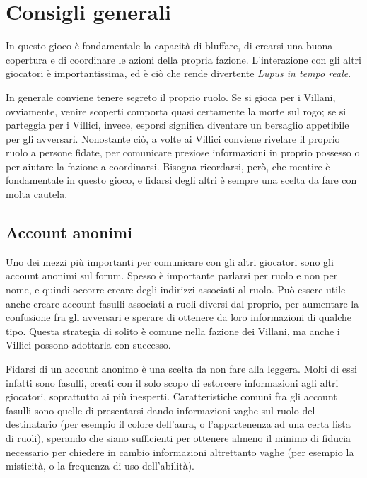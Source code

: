 \documentclass[a4paper,10pt]{article}
\begin{document}
\section{Consigli generali}

In questo gioco è fondamentale la capacità di bluffare, di crearsi una buona copertura e di coordinare le azioni della propria fazione. L'interazione con gli altri giocatori è importantissima, ed è ciò che rende divertente \emph{Lupus in tempo reale}.

In generale conviene tenere segreto il proprio ruolo. Se si gioca per i Villani, ovviamente, venire scoperti comporta quasi certamente la morte sul rogo; se si parteggia per i Villici, invece, esporsi significa diventare un bersaglio appetibile per gli avversari. Nonostante ciò, a volte ai Villici conviene rivelare il proprio ruolo a persone fidate, per comunicare preziose informazioni in proprio possesso o per aiutare la fazione a coordinarsi. Bisogna ricordarsi, però, che mentire è fondamentale in questo gioco, e fidarsi degli altri è sempre una scelta da fare con molta cautela.

\subsection{Account anonimi}

Uno dei mezzi più importanti per comunicare con gli altri giocatori sono gli account anonimi sul forum. Spesso è importante parlarsi per ruolo e non per nome, e quindi occorre creare degli indirizzi associati al ruolo. Può essere utile anche creare account fasulli associati a ruoli diversi dal proprio, per aumentare la confusione fra gli avversari e sperare di ottenere da loro informazioni di qualche tipo. Questa strategia di solito è comune nella fazione dei Villani, ma anche i Villici possono adottarla con successo.

Fidarsi di un account anonimo è una scelta da non fare alla leggera. Molti di essi infatti sono fasulli, creati con il solo scopo di estorcere informazioni agli altri giocatori, soprattutto ai più inesperti. Caratteristiche comuni fra gli account fasulli sono quelle di presentarsi dando informazioni vaghe sul ruolo del destinatario (per esempio il colore dell'aura, o l'appartenenza ad una certa lista di ruoli), sperando che siano sufficienti per ottenere almeno il minimo di fiducia necessario per chiedere in cambio informazioni altrettanto vaghe (per esempio la misticità, o la frequenza di uso dell'abilità).
\end{document}
